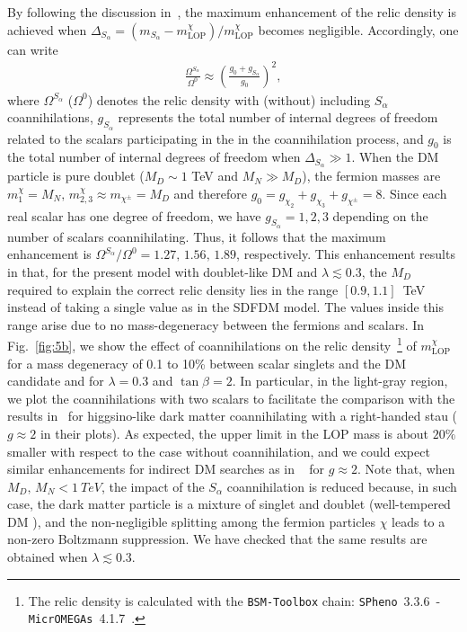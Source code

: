 By following the discussion in~\cite{Klasen:2013jpa}, the maximum
enhancement of the relic density is achieved when
$\Delta_{S_\alpha}=(m_{S_{\alpha}}-m_{\text{LOP}}^{\chi})/m_{\text{LOP}}^{\chi}$
becomes negligible. 
Accordingly, one can write
\begin{align}
\frac{  \Omega^{S_{\alpha}}}{\Omega^{0}}\approx\left( \frac{g_0+g_{S_{\alpha}}}{g_0} \right)^2,
\end{align}
where $\Omega^{S_{\alpha}}$ ($\Omega^{0}$) denotes the relic density
with (without) including $S_{\alpha}$ coannihilations,
$g_{S_{\alpha}}$ represents the total number of internal degrees of
freedom related to the scalars participating in the in the
coannihilation process, and $g_{0}$ is the total number of internal
degrees of freedom when $\Delta_{S_\alpha}\gg1$. 
When the DM particle is pure doublet ($M_D\sim1$ TeV and $M_N\gg M_D$),
the fermion masses are $m_1^{\chi}=M_N,\,m_{2,3}^{\chi}\approx
m_{\chi^\pm}=M_D$ and therefore
$g_{0}=g_{\chi_2}+g_{\chi_3}+g_{\chi^\pm}=8$.
Since each real scalar has one degree of freedom, we have
$g_{S_{\alpha}}=1,2,3$ depending on the number of scalars
coannihilating. Thus, it follows that the maximum enhancement is
$\Omega^{S_{\alpha}}/\Omega^{0}=1.27,\, 1.56,\,1.89$, respectively. 
This enhancement results in that, for the present model with
doublet-like DM and $\lambda\lesssim0.3$, the $M_D$ required to explain
the correct relic density lies in the range $[0.9,1.1]$~TeV instead of
taking a single value as in the SDFDM model.  
The values inside this range arise due to no mass-degeneracy
between the fermions and scalars. 
In Fig.~\ref{fig:5b}, we show the effect of coannihilations on the
relic density~\footnote{The relic density is calculated with the
  \texttt{BSM-Toolbox} chain: 
\texttt{SPheno}~3.3.6~\cite{Porod:2011nf}-\texttt{MicrOMEGAs}~4.1.7~\cite{Belanger:2006is,Belanger:2014vza}.}
of $m_{\text{LOP}}^{\chi}$ for a mass degeneracy of 0.1
to 10\% between  scalar singlets and the DM candidate and for
$\lambda=0.3$ and $\tan\beta=2$. 
In particular, in the light-gray region, we plot the coannihilations
with two scalars to facilitate the comparison with the results
in~\cite{Profumo:2006bx} for higgsino-like dark matter coannihilating
with a right-handed stau ($g\approx 2$ in their plots).
As expected, the upper limit in the LOP mass is about $20\%$ smaller
with respect to the case without coannihilation, and we could 
expect similar enhancements for indirect DM searches
as  in ~\cite{Profumo:2006bx} for $g\approx 2$.
Note that, when $M_D,\,M_N<\SI{1}{TeV}$, the impact of the $S_\alpha$ coannihilation is reduced because, in such case, the
dark matter particle is a mixture of singlet and doublet
(well-tempered DM \cite{ArkaniHamed:2006mb}), and the non-negligible
splitting among the fermion particles $\chi$ leads to a non-zero
Boltzmann suppression. 
We have checked that the same results are obtained when
$\lambda\lesssim0.3$.


